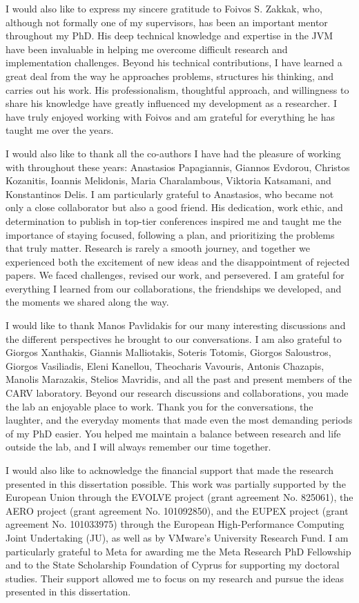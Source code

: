 I would also like to express my sincere gratitude to Foivos S. Zakkak, who, although not formally one of my supervisors, has been an important mentor throughout my PhD.
His deep technical knowledge and expertise in the JVM have been invaluable in helping me overcome difficult research and implementation challenges.
Beyond his technical contributions, I have learned a great deal from the way he approaches problems, structures his thinking, and carries out his work.
His professionalism, thoughtful approach, and willingness to share his knowledge have greatly influenced my development as a researcher.
I have truly enjoyed working with Foivos and am grateful for everything he has taught me over the years.

I would also like to thank all the co-authors I have had the pleasure of working with throughout these years: Anastasios Papagiannis, Giannos Evdorou, Christos Kozanitis, Ioannis Melidonis, Maria Charalambous, Viktoria Katsamani, and Konstantinos Delis.
I am particularly grateful to Anastasios, who became not only a close collaborator but also a good friend.
His dedication, work ethic, and determination to publish in top-tier conferences inspired me and taught me the importance of staying focused, following a plan, and prioritizing the problems that truly matter.
Research is rarely a smooth journey, and together we experienced both the excitement of new ideas and the disappointment of rejected papers.
We faced challenges, revised our work, and persevered.
I am grateful for everything I learned from our collaborations, the friendships we developed, and the moments we shared along the way.

I would like to thank Manos Pavlidakis for our many interesting discussions and the different perspectives he brought to our conversations.
I am also grateful to Giorgos Xanthakis, Giannis Malliotakis, Soteris Totomis, Giorgos Saloustros, Giorgos Vasiliadis, Eleni Kanellou, Theocharis Vavouris, Antonis Chazapis, Manolis Marazakis, Stelios Mavridis, and all the past and present members of the CARV laboratory.
Beyond our research discussions and collaborations, you made the lab an enjoyable place to work.
Thank you for the conversations, the laughter, and the everyday moments that made even the most demanding periods of my PhD easier.
You helped me maintain a balance between research and life outside the lab, and I will always remember our time together.

I would also like to acknowledge the financial support that made the research presented in this dissertation possible.
This work was partially supported by the European Union through the EVOLVE project (grant agreement No. 825061), the AERO project (grant agreement No. 101092850), and the EUPEX project (grant agreement No. 101033975) through the European High-Performance Computing Joint Undertaking (JU), as well as by VMware's University Research Fund.
I am particularly grateful to Meta for awarding me the Meta Research PhD Fellowship and to the State Scholarship Foundation of Cyprus for supporting my doctoral studies.
Their support allowed me to focus on my research and pursue the ideas presented in this dissertation.

